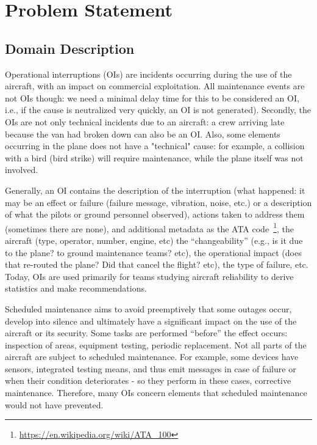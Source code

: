 \documentclass[a4paper,english,submission]{rnti}  %
\begin{document}
\section{Problem Statement}
\label{sec:statement}

\subsection{Domain Description}
Operational interruptions (OIs) are incidents occurring during the use of the aircraft, with an impact on commercial exploitation. All maintenance events are not OIs though: we need a minimal delay time for this to be considered an OI, i.e., if the cause is neutralized very quickly, an OI is not generated). Secondly, the OIs are not only technical incidents due to an aircraft: a crew arriving late because the van had broken down can also be an OI. Also, some elements occurring in the plane does not have a "technical" cause: for example, a collision with a bird (bird strike) will require maintenance, while the plane itself was not involved.

Generally, an OI contains the description of the interruption (what happened: it may be an effect or failure (failure message, vibration, noise, etc.) or a description of what the pilots or ground personnel observed), actions taken to address them (sometimes there are none), and additional metadata as the ATA code~\footnote{\url{https://en.wikipedia.org/wiki/ATA_100}}, the aircraft (type, operator, number, engine, etc) the ``changeability'' (e.g., is it due to the plane? to ground maintenance teams? etc), the operational impact (does that re-routed the plane? Did that cancel the flight? etc), the type of failure, etc. Today, OIs are used primarily for teams studying aircraft reliability to derive statistics and make recommendations. 

Scheduled maintenance aims to avoid preemptively that some outages occur, develop into silence and ultimately have a significant impact on the use of the aircraft or its security. Some tasks are performed ``before'' the effect occurs: inspection of areas, equipment testing, periodic replacement.
Not all parts of the aircraft are subject to scheduled maintenance. For example, some devices have sensors, integrated testing means, and thus emit messages in case of failure or when their condition deteriorates - so they perform in these cases, corrective maintenance. Therefore, many OIs concern elements that scheduled maintenance would not have prevented.
\end{document}
